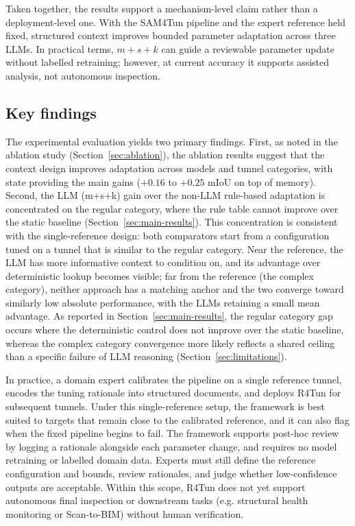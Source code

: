 \documentclass[a4paper,fleqn]{cas-dc}
\begin{document}
{Taken together, the results support a mechanism-level claim rather than a deployment-level one. With the SAM4Tun pipeline and the expert reference held fixed, structured context improves bounded parameter adaptation across three LLMs. In practical terms, \mbox{$m+s+k$} can guide a reviewable parameter update without labelled retraining; however, at current accuracy it supports assisted analysis, not autonomous inspection.

\subsection{Key findings}

The experimental evaluation yields two primary findings. First, as noted in the ablation study (Section~\ref{sec:ablation}), the ablation results suggest that the context design improves adaptation across models and tunnel categories, with state providing the main gains ($+0.16$ to $+0.25$ mIoU on top of memory). Second, the LLM (m+s+k) gain over the non-LLM rule-based adaptation is concentrated on the regular category, where the rule table cannot improve over the static baseline (Section~\ref{sec:main-results}). This concentration is consistent with the single-reference design: both comparators start from a configuration tuned on a tunnel that is similar to the regular category. Near the reference, the LLM has more informative context to condition on, and its advantage over deterministic lookup becomes visible; far from the reference (the complex category), neither approach has a matching anchor and the two converge toward similarly low absolute performance, with the LLMs retaining a small mean advantage. As reported in Section~\ref{sec:main-results}, the regular category gap occurs where the deterministic control does not improve over the static baseline, whereas the complex category convergence more likely reflects a shared ceiling than a specific failure of LLM reasoning (Section~\ref{sec:limitations}).


In practice, a domain expert calibrates the pipeline on a single reference tunnel, encodes the tuning rationale into structured documents, and deploys R4Tun for subsequent tunnels. Under this single-reference setup, the framework is best suited to targets that remain close to the calibrated reference, and it can also flag when the fixed pipeline begins to fail. The framework supports post-hoc review by logging a rationale alongside each parameter change, and requires no model retraining or labelled domain data. Experts must still define the reference configuration and bounds, review rationales, and judge whether low-confidence outputs are acceptable. Within this scope, R4Tun does not yet support autonomous final inspection or downstream tasks (e.g. structural health monitoring or Scan-to-BIM) without human verification.


}
\end{document}
